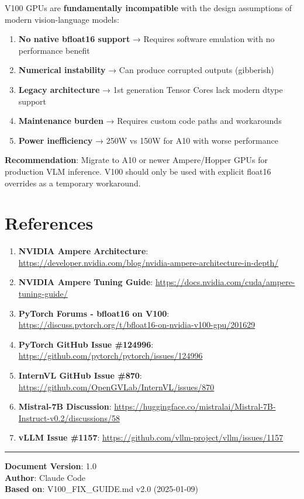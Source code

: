 \documentclass[11pt,a4paper]{article}
\begin{document}
V100 GPUs are \textbf{fundamentally incompatible} with the design assumptions of modern vision-language models:

\begin{enumerate}[leftmargin=*]
    \item \textbf{No native bfloat16 support} → Requires software emulation with no performance benefit
    \item \textbf{Numerical instability} → Can produce corrupted outputs (gibberish)
    \item \textbf{Legacy architecture} → 1st generation Tensor Cores lack modern dtype support
    \item \textbf{Maintenance burden} → Requires custom code paths and workarounds
    \item \textbf{Power inefficiency} → 250W vs 150W for A10 with worse performance
\end{enumerate}

\textbf{Recommendation}: Migrate to A10 or newer Ampere/Hopper GPUs for production VLM inference. V100 should only be used with explicit float16 overrides as a temporary workaround.

\section{References}

\begin{enumerate}[leftmargin=*]
    \item \textbf{NVIDIA Ampere Architecture}: \url{https://developer.nvidia.com/blog/nvidia-ampere-architecture-in-depth/}
    \item \textbf{NVIDIA Ampere Tuning Guide}: \url{https://docs.nvidia.com/cuda/ampere-tuning-guide/}
    \item \textbf{PyTorch Forums - bfloat16 on V100}: \url{https://discuss.pytorch.org/t/bfloat16-on-nvidia-v100-gpu/201629}
    \item \textbf{PyTorch GitHub Issue \#124996}: \url{https://github.com/pytorch/pytorch/issues/124996}
    \item \textbf{InternVL GitHub Issue \#870}: \url{https://github.com/OpenGVLab/InternVL/issues/870}
    \item \textbf{Mistral-7B Discussion}: \url{https://huggingface.co/mistralai/Mistral-7B-Instruct-v0.2/discussions/58}
    \item \textbf{vLLM Issue \#1157}: \url{https://github.com/vllm-project/vllm/issues/1157}
\end{enumerate}

\vspace{0.5cm}
\hrule
\vspace{0.3cm}

\noindent\textbf{Document Version}: 1.0\\
\textbf{Author}: Claude Code\\
\textbf{Based on}: V100\_FIX\_GUIDE.md v2.0 (2025-01-09)
\end{document}
